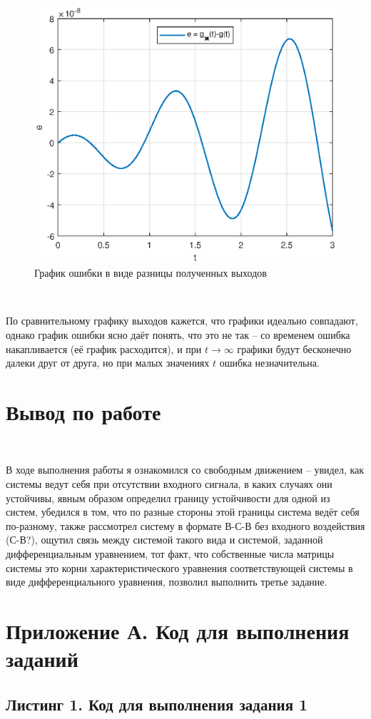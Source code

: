 \documentclass[a4paper]{article}
\begin{document}
\begin{figure}[H]
    \centering
    \includegraphics[width=0.65\linewidth]{ex3/error.eps}
    \caption{График ошибки в виде разницы полученных выходов}
\end{figure}\ 

По сравнительному графику выходов кажется, что графики идеально совпадают, однако график ошибки ясно даёт понять, что это не так -- со временем ошибка накапливается (её график расходится), и при $t \to \infty$ графики будут бесконечно далеки друг от друга, но при малых значениях $t$ ошибка незначительна.

\section{Вывод по работе}\ 

В ходе выполнения работы я ознакомился со свободным движением -- увидел, как системы ведут себя при отсутствии входного сигнала, в каких случаях они устойчивы, явным образом определил границу устойчивости для одной из систем, убедился в том, что по разные стороны этой границы система ведёт себя по-разному, также рассмотрел систему в формате В-С-В без входного воздействия (С-В?), ощутил связь между системой такого вида и системой, заданной дифференциальным уравнением, тот факт, что собственные числа матрицы системы это корни характеристического уравнения соответствующей системы в виде дифференциального уравнения, позволил выполнить третье задание. 

\newpage

\section{Приложение А. Код для выполнения заданий}

\subsection*{Листинг 1. Код для выполнения задания 1}
\end{document}
